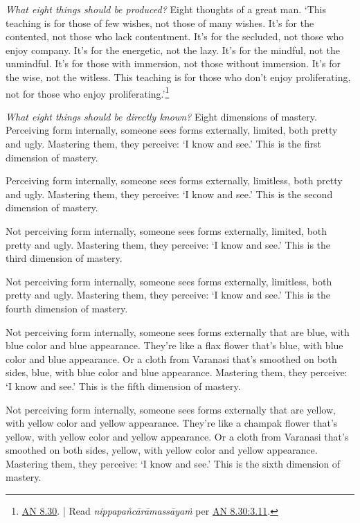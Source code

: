 \documentclass[12pt,openany]{book}%
\begin{document}
\emph{What eight things should be produced?} Eight thoughts of a great man. ‘This teaching is for those of few wishes, not those of many wishes. It’s for the contented, not those who lack contentment. It’s for the secluded, not those who enjoy company. It’s for the energetic, not the lazy. It’s for the mindful, not the unmindful. It’s for those with immersion, not those without immersion. It’s for the wise, not the witless. This teaching is for those who don’t enjoy proliferating, not for those who enjoy proliferating.’\footnote{\href{https://suttacentral.net/an8.30/en/sujato}{AN 8.30}. | Read \textit{\textsanskrit{nippapañcārāmassāyaṁ}} per \href{https://suttacentral.net/an8.30/en/sujato\#3.11}{AN 8.30:3.11}. } 

\emph{What eight things should be directly known?} Eight dimensions of mastery. Perceiving form internally, someone sees forms externally, limited, both pretty and ugly. Mastering them, they perceive: ‘I know and see.’ This is the first dimension of mastery. 

Perceiving form internally, someone sees forms externally, limitless, both pretty and ugly. Mastering them, they perceive: ‘I know and see.’ This is the second dimension of mastery. 

Not perceiving form internally, someone sees forms externally, limited, both pretty and ugly. Mastering them, they perceive: ‘I know and see.’ This is the third dimension of mastery. 

Not perceiving form internally, someone sees forms externally, limitless, both pretty and ugly. Mastering them, they perceive: ‘I know and see.’ This is the fourth dimension of mastery. 

Not perceiving form internally, someone sees forms externally that are blue, with blue color and blue appearance. They’re like a flax flower that’s blue, with blue color and blue appearance. Or a cloth from Varanasi that’s smoothed on both sides, blue, with blue color and blue appearance. Mastering them, they perceive: ‘I know and see.’ This is the fifth dimension of mastery. 

Not perceiving form internally, someone sees forms externally that are yellow, with yellow color and yellow appearance. They’re like a champak flower that’s yellow, with yellow color and yellow appearance. Or a cloth from Varanasi that’s smoothed on both sides, yellow, with yellow color and yellow appearance. Mastering them, they perceive: ‘I know and see.’ This is the sixth dimension of mastery. 
\end{document}
